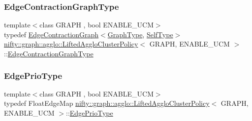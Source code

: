 \subsubsection{\texorpdfstring{Edge\+Contraction\+Graph\+Type}{EdgeContractionGraphType}}
{\footnotesize\ttfamily template$<$class G\+R\+A\+PH , bool E\+N\+A\+B\+L\+E\+\_\+\+U\+CM$>$ \\
typedef \hyperlink{classnifty_1_1graph_1_1EdgeContractionGraph}{Edge\+Contraction\+Graph}$<$\hyperlink{classnifty_1_1graph_1_1agglo_1_1LiftedAggloClusterPolicy_a727d681b2fa133b8c9b225ab11cd2402}{Graph\+Type}, \hyperlink{classnifty_1_1graph_1_1agglo_1_1LiftedAggloClusterPolicy}{Self\+Type}$>$ \hyperlink{classnifty_1_1graph_1_1agglo_1_1LiftedAggloClusterPolicy}{nifty\+::graph\+::agglo\+::\+Lifted\+Agglo\+Cluster\+Policy}$<$ G\+R\+A\+PH, E\+N\+A\+B\+L\+E\+\_\+\+U\+CM $>$\+::\hyperlink{classnifty_1_1graph_1_1agglo_1_1LiftedAggloClusterPolicy_a2fb57e57cf31de0f2d446cfd17d263a7}{Edge\+Contraction\+Graph\+Type}}

\mbox{\label{classnifty_1_1graph_1_1agglo_1_1LiftedAggloClusterPolicy_a0a1035fa94e97e15913aee18d446da78}} 
\subsubsection{\texorpdfstring{Edge\+Prio\+Type}{EdgePrioType}}
{\footnotesize\ttfamily template$<$class G\+R\+A\+PH , bool E\+N\+A\+B\+L\+E\+\_\+\+U\+CM$>$ \\
typedef Float\+Edge\+Map \hyperlink{classnifty_1_1graph_1_1agglo_1_1LiftedAggloClusterPolicy}{nifty\+::graph\+::agglo\+::\+Lifted\+Agglo\+Cluster\+Policy}$<$ G\+R\+A\+PH, E\+N\+A\+B\+L\+E\+\_\+\+U\+CM $>$\+::\hyperlink{classnifty_1_1graph_1_1agglo_1_1LiftedAggloClusterPolicy_a0a1035fa94e97e15913aee18d446da78}{Edge\+Prio\+Type}}

\mbox{\label{classnifty_1_1graph_1_1agglo_1_1LiftedAggloClusterPolicy_a910399705bc9a60aabb360ac4e9c21d8}} 
